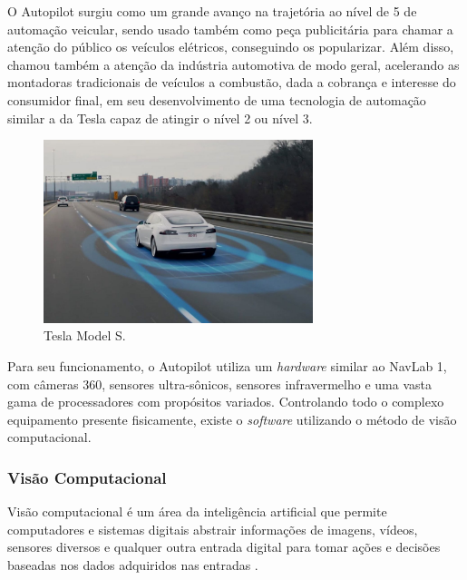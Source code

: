 O Autopilot surgiu como um grande avanço na trajetória ao nível de 5 de
automação veicular, sendo usado também como peça publicitária para chamar a
atenção do público os veículos elétricos, conseguindo os popularizar. Além
disso, chamou também a atenção da indústria automotiva de modo geral,
acelerando as montadoras tradicionais de veículos a combustão, dada a cobrança
e interesse do consumidor final, em seu desenvolvimento de uma tecnologia de
automação similar a da Tesla capaz de atingir o  nível 2 ou nível 3.

\begin{figure}[htb]
        \centering
        \caption{\label{fig_models}Tesla Model S.}
        \includegraphics[width=0.7\textwidth]{images/01e87df6ce89a7b3ea1141da979d599b.jpg}
\end{figure}


Para seu funcionamento, o Autopilot utiliza um \textit{hardware} similar ao NavLab 1,
com câmeras 360, sensores ultra-sônicos, sensores infravermelho e uma vasta
gama de processadores com propósitos variados. Controlando todo o complexo
equipamento presente fisicamente, existe o \textit{software} utilizando o método de
visão computacional.

\subsubsection{Vis{\~a}o Computacional}

Visão computacional é um área da inteligência artificial que permite
computadores e sistemas digitais abstrair informações de imagens, vídeos,
sensores diversos e qualquer outra entrada digital para tomar ações e decisões
baseadas nos dados adquiridos nas entradas \cite{ibm2019}.  

